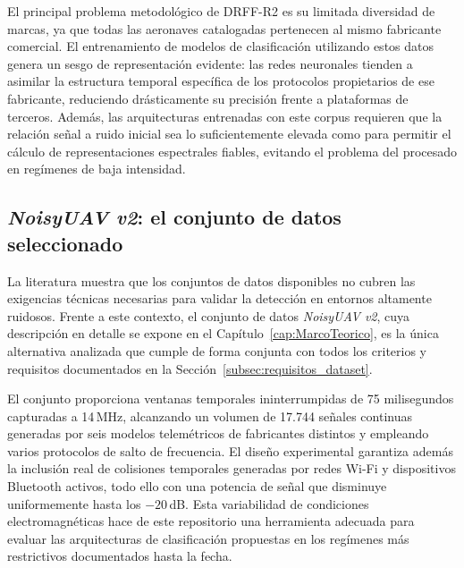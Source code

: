 El principal problema metodológico de DRFF-R2 es su limitada diversidad de marcas, ya que todas las aeronaves catalogadas pertenecen al mismo fabricante comercial. El entrenamiento de modelos de clasificación utilizando estos datos genera un sesgo de representación evidente: las redes neuronales tienden a asimilar la estructura temporal específica de los protocolos propietarios de ese fabricante, reduciendo drásticamente su precisión frente a plataformas de terceros. Además, las arquitecturas entrenadas con este corpus \cite{zheng_uav_2025} requieren que la relación señal a ruido inicial sea lo suficientemente elevada como para permitir el cálculo de representaciones espectrales fiables, evitando el problema del procesado en regímenes de baja intensidad.

\subsection{\textit{NoisyUAV v2}: el conjunto de datos seleccionado}
\label{subsec:noisyuav}

La literatura muestra que los conjuntos de datos disponibles no cubren las exigencias técnicas necesarias para validar la detección en entornos altamente ruidosos. Frente a este contexto, el conjunto de datos \textit{NoisyUAV v2}, cuya descripción en detalle se expone en el Capítulo~\ref{cap:MarcoTeorico}, es la única alternativa analizada que cumple de forma conjunta con todos los criterios y requisitos documentados en la Sección~\ref{subsec:requisitos_dataset}.

El conjunto proporciona ventanas temporales ininterrumpidas de 75 milisegundos capturadas a 14\,MHz, alcanzando un volumen de 17.744 señales continuas generadas por seis modelos telemétricos de fabricantes distintos y empleando varios protocolos de salto de frecuencia. El diseño experimental garantiza además la inclusión real de colisiones temporales generadas por redes Wi-Fi y dispositivos Bluetooth activos, todo ello con una potencia de señal que disminuye uniformemente hasta los $-20$\,dB. Esta variabilidad de condiciones electromagnéticas hace de este repositorio una herramienta adecuada para evaluar las arquitecturas de clasificación propuestas en los regímenes más restrictivos documentados hasta la fecha.

